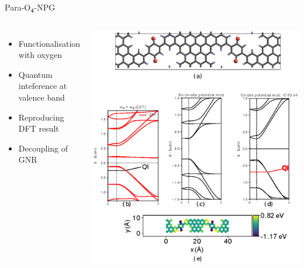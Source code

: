 \documentclass[hyperref={colorlinks=true,urlcolor=blue,linkcolor=.},aspectratio=1610,mathserif]{beamer}
\newcommand*\mathinhead[2]{\texorpdfstring{$\boldsymbol{#1}$}{#2}}
\begin{document}
\begin{frame}{Para-O\mathinhead{_4}{_4}-NPG}
\centering
\begin{columns}[c]
    \begin{itemize}
        \item Functionalisation with oxygen
        \item Quantum inteference at valence band 
        \item Reproducing DFT result
        \item Decoupling of GNR 
    \end{itemize}
    \includegraphics[width=\textwidth]{Figures/fig19.eps}
\end{columns}
\end{frame}
\end{document}
